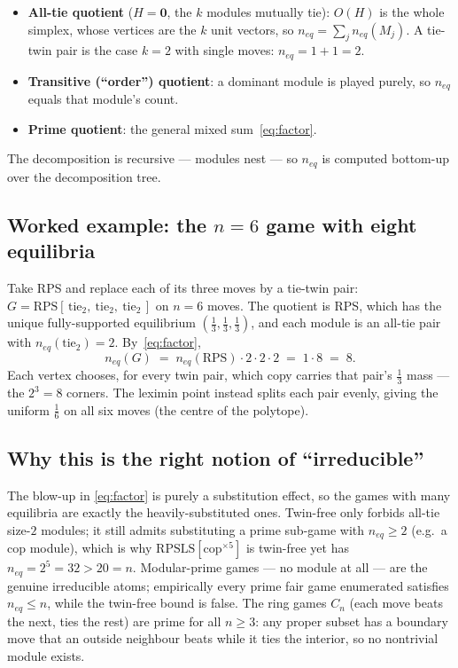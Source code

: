 \documentclass[11pt]{article}
\newcommand{\zero}{\mathbf{0}}
\theoremstyle{plain}
\theoremstyle{definition}
\begin{document}
\begin{itemize}[leftmargin=2em]
  \item \textbf{All-tie quotient} ($H=\zero$, the $k$ modules mutually tie): $O(H)$ is
  the whole simplex, whose vertices are the $k$ unit vectors, so
  $n_{eq}=\sum_j n_{eq}(M_j)$. A tie-twin pair is the case $k=2$ with single moves:
  $n_{eq}=1+1=2$.
  \item \textbf{Transitive (``order'') quotient}: a dominant module is played purely,
  so $n_{eq}$ equals that module's count.
  \item \textbf{Prime quotient}: the general mixed sum~\eqref{eq:factor}.
\end{itemize}
The decomposition is recursive --- modules nest --- so $n_{eq}$ is computed bottom-up
over the decomposition tree.

\subsection{Worked example: the $n=6$ game with eight equilibria}

Take RPS and replace each of its three moves by a tie-twin pair:
$G=\mathrm{RPS}[\,\text{tie}_2,\ \text{tie}_2,\ \text{tie}_2\,]$ on $n=6$ moves. The
quotient is RPS, which has the unique fully-supported equilibrium
$(\tfrac13,\tfrac13,\tfrac13)$, and each module is an all-tie pair with
$n_{eq}(\text{tie}_2)=2$. By~\eqref{eq:factor},
\[
  n_{eq}(G) \;=\; n_{eq}(\mathrm{RPS})\cdot 2\cdot 2\cdot 2 \;=\; 1\cdot 8 \;=\; 8 .
\]
Each vertex chooses, for every twin pair, which copy carries that pair's $\tfrac13$
mass --- the $2^3=8$ corners. The leximin point instead splits each pair evenly,
giving the uniform $\tfrac16$ on all six moves (the centre of the polytope).

\subsection{Why this is the right notion of ``irreducible''}

The blow-up in \eqref{eq:factor} is purely a substitution effect, so the games with
many equilibria are exactly the heavily-substituted ones. Twin-free only forbids
all-tie size-$2$ modules; it still admits substituting a prime sub-game with
$n_{eq}\ge 2$ (e.g.\ a cop module), which is why
$\mathrm{RPSLS}[\text{cop}^{\times 5}]$ is twin-free yet has $n_{eq}=2^5=32>20=n$.
Modular-prime games --- no module at all --- are the genuine irreducible atoms;
empirically every prime fair game enumerated satisfies $n_{eq}\le n$, while the
twin-free bound is false. The ring games $C_n$ (each move beats the next, ties the
rest) are prime for all $n\ge 3$: any proper subset has a boundary move that an
outside neighbour beats while it ties the interior, so no nontrivial module exists.
\end{document}
